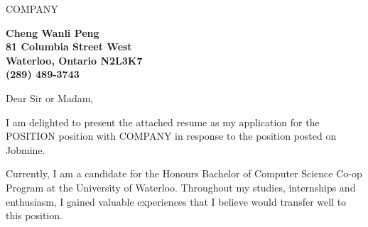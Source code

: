 \documentclass[11pt]{letter} %
\begin{document}
\newcommand{\Position}{Software Developer}
\newcommand{\Company}{Complete Solar Solution}
\newcommand{\Address}{1065 East Hillsdale Blvd. Suite 308}
\newcommand{\Location}{Foster City, CA 94404}



\begin{letter}{ 
COMPANY \\
} 


\begin{center}
\large\bf Cheng Wanli Peng\\ %
81 Columbia Street West\\ Waterloo, Ontario N2L3K7\\ (289) 489-3743 %
\end{center} 
\vfill

\signature{Cheng Wanli Peng} %


\opening{Dear Sir or Madam,} 

I am delighted to present the attached resume as my application for the POSITION position with COMPANY in response to the position posted on Jobmine.

Currently, I am a candidate for the Honours Bachelor of Computer Science Co-op Program at the University of Waterloo. Throughout my studies, internships and enthusiasm, I gained valuable experiences that I believe would transfer well to this position.


\end{letter}
\end{document}
